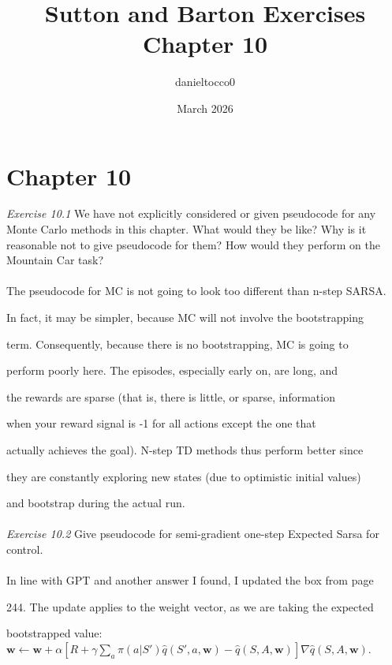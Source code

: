 \documentclass{article}
\title{Sutton and Barton Exercises Chapter 10}
\author{danieltocco0 }
\date{March 2026}
\begin{document}
\maketitle

\section{Chapter 10}
\textit{Exercise 10.1} We have not explicitly considered or given pseudocode for any Monte Carlo
methods in this chapter. What would they be like? Why is it reasonable not to give
pseudocode for them? How would they perform on the Mountain Car task?
\\
\\

The pseudocode for MC is not going to look too different than n-step SARSA.

In fact, it may be simpler, because MC will not involve the bootstrapping 

term. Consequently, because there is no bootstrapping, MC is going to 

perform poorly here. The episodes, especially early on, are long, and 

the rewards are sparse (that is, there is little, or sparse, information

when your reward signal is -1 for all actions except the one that

actually achieves the goal). N-step TD methods thus perform better since

they are constantly exploring new states (due to optimistic initial values)

and bootstrap during the actual run.
\\\\
\textit{Exercise 10.2} Give pseudocode for semi-gradient one-step Expected Sarsa for control.
\\
\\

In line with GPT and another answer I found, I updated the box from page 

244. The update applies to the weight vector, as we are taking the expected 

bootstrapped value:
\\

$\mathbf{w} \leftarrow \mathbf{w} + \alpha \left[ R + \gamma \sum_{a} \pi(a | S') \hat{q}(S', a, \mathbf{w}) - \hat{q}(S, A, \mathbf{w}) \right] \nabla \hat{q}(S, A, \mathbf{w}).$
\\
\end{document}
